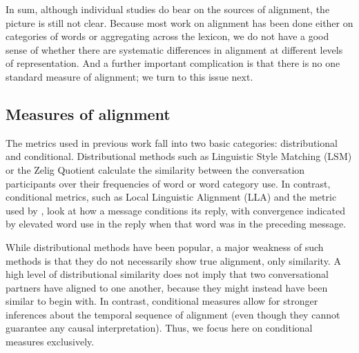 \documentclass[11pt]{article}
\begin{document}
In sum, although individual studies do bear on the sources of alignment, the picture is still not clear. Because most work on alignment has been done either on categories of words or aggregating across the lexicon, we do not have a good sense of whether there are systematic differences in alignment at different levels of representation. And a further important complication is that there is no one standard measure of alignment; we turn to this issue next.



\subsection{Measures of alignment}

 The metrics used in previous work fall into two basic categories: distributional and conditional. Distributional methods such as Linguistic Style Matching (LSM) \cite{NiederhofferPennebaker2002,IrelandEtAl2011} or the Zelig Quotient \cite{JonesEtAl2014} calculate the similarity between the conversation participants over their frequencies of word or word category use. In contrast, conditional metrics, such as Local Linguistic Alignment (LLA) \cite{FusaroliEtAl2012,WangReitterYen2014} and the metric used by \cite{DNMGamonDumais2011}, look at how a message conditions its reply, with convergence indicated by elevated word use in the reply when that word was in the preceding message.

While distributional methods have been popular, a major weakness of such methods is that they do not necessarily show true alignment, only similarity. A high level of distributional similarity does not imply that two conversational partners have aligned to one another, because they might instead have been similar to begin with. In contrast, conditional measures allow for stronger inferences about the temporal sequence of alignment (even though they cannot guarantee any causal interpretation). Thus, we focus here on conditional measures exclusively.

\end{document}

